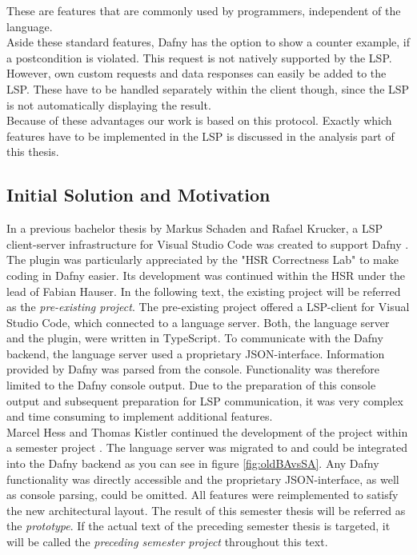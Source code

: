 These are features that are commonly used by programmers, independent of the language.\\

Aside these standard features, Dafny has the option to show a counter example, if a postcondition is violated.
This request is not natively supported by the LSP.
However, own custom requests and data responses can easily be added to the LSP.
These have to be handled separately within the client though, since the LSP is not automatically displaying the result. \\

Because of these advantages our work is based on this protocol.
Exactly which features have to be implemented in the LSP is discussed in the analysis part of this thesis.

\subsection{Initial Solution and Motivation}
\label{section:introduction:initialsolution}
In a previous bachelor thesis by Markus Schaden and Rafael Krucker, a LSP client-server infrastructure for Visual Studio Code was created to support Dafny \cite{ba}.
The plugin was particularly appreciated by the "HSR Correctness Lab" \cite{correctnessLab} to make coding in Dafny easier.
Its development was continued within the HSR under the lead of Fabian Hauser.
In the following text, the existing project will be referred as the \textit{pre-existing project}.
The pre-existing project offered a LSP-client for Visual Studio Code, which connected to a language server.
Both, the language server and the plugin, were written in TypeScript.
To communicate with the Dafny backend, the language server used a proprietary JSON-interface.
Information provided by Dafny was parsed from the console.
Functionality was therefore limited to the Dafny console output.
Due to the preparation of this console output and subsequent preparation for LSP communication,
it was very complex and time consuming to implement additional features. \\

Marcel Hess and Thomas Kistler continued the development of the project within a semester project \cite{sa}.
The language server was migrated to \CsharpWithSpace and could be integrated into the Dafny backend
as you can see in figure \ref{fig:oldBAvsSA}.
Any Dafny functionality was directly accessible and the proprietary JSON-interface, as well as console parsing, could be omitted.
All features were reimplemented to satisfy the new architectural layout.
The result of this semester thesis will be referred as the \textit{prototype}.
If the actual text of the preceding semester thesis is targeted, it will be called the \textit{preceding semester project} throughout this text.

